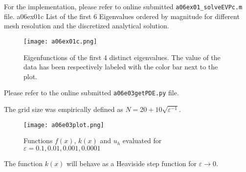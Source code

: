 For the implementation, please refer to online submitted \texttt{a06ex01\_solveEVPc.m} file.
%
\vspace*{2\FigUpperVSpace}
		 {a06ex01c}
		 {List of the first 6 Eigenvalues ordered by magnitude for different mesh resolution and the discretized analytical solution.}
%
\begin{figure}[H]
	\centering
	\texttt{[image: a06ex01c.png]} 
	\caption{Eigenfunctions of the first 4 distinct eigenvalues.
			 The value of the data has been respectively labeled with the color bar next to the plot.}
	\label{fig:a06ex01c}
\end{figure}
%
%

%

%

%


%

%

%

%

Please refer to the online submitted \texttt{a06e03getPDE.py} file.


The grid size was empirically defined as $N = 20 + 10\sqrt{\varepsilon^{-1}}$.

\begin{figure}[H]
	\centering
	\texttt{[image: a06e03plot.png]}
	\caption{Functions $f(x)$, $k(x)$ and $u_h$ evaluated for $\varepsilon = 0.1, 0.01, 0.001, 0.0001$}
	\label{fig:a06e03plot}
\end{figure}

The function $k(x)$ will behave as a Heaviside step function for $\varepsilon \to 0$.